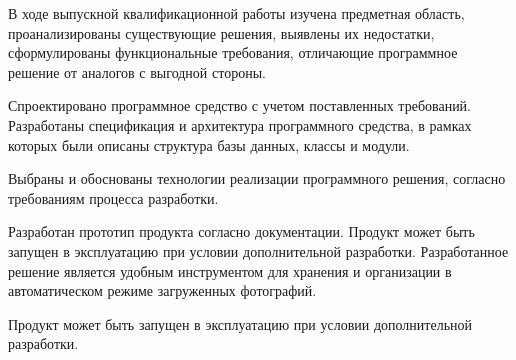 
В ходе выпускной квалификационной работы изучена предметная область, проанализированы существующие решения, выявлены их недостатки, сформулированы функциональные требования, отличающие программное решение от аналогов с выгодной стороны.

Спроектировано программное средство с учетом поставленных требований.
Разработаны спецификация и архитектура программного средства, в рамках которых были описаны структура базы данных, классы и модули.

Выбраны и обоснованы технологии реализации программного решения, согласно требованиям процесса разработки.

Разработан прототип продукта согласно документации. 
Продукт может быть запущен в эксплуатацию при условии дополнительной разработки.
Разработанное решение является удобным инструментом для хранения и организации в автоматическом режиме загруженных фотографий.

Продукт может быть запущен в эксплуатацию при условии дополнительной разработки.

\clearpage